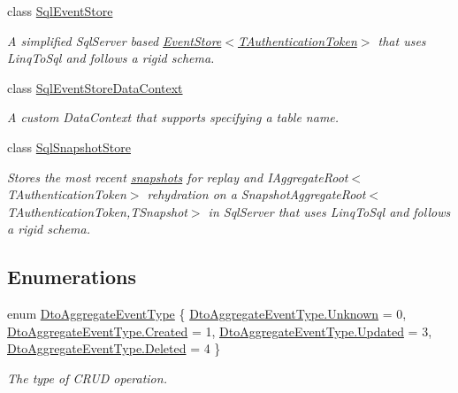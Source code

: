 \begin{DoxyCompactItemize}
class \hyperlink{classCqrs_1_1Events_1_1SqlEventStore}{Sql\+Event\+Store}
\begin{DoxyCompactList}\small\item\em A simplified Sql\+Server based \hyperlink{classCqrs_1_1Events_1_1EventStore_a6346cb2aea4c5b4e740dc6cfb15abab8_a6346cb2aea4c5b4e740dc6cfb15abab8}{Event\+Store$<$\+T\+Authentication\+Token$>$} that uses Linq\+To\+Sql and follows a rigid schema. \end{DoxyCompactList}\item 
class \hyperlink{classCqrs_1_1Events_1_1SqlEventStoreDataContext}{Sql\+Event\+Store\+Data\+Context}
\begin{DoxyCompactList}\small\item\em A custom Data\+Context that supports specifying a table name. \end{DoxyCompactList}\item 
class \hyperlink{classCqrs_1_1Events_1_1SqlSnapshotStore}{Sql\+Snapshot\+Store}
\begin{DoxyCompactList}\small\item\em Stores the most recent \hyperlink{}{snapshots} for replay and I\+Aggregate\+Root$<$\+T\+Authentication\+Token$>$ rehydration on a Snapshot\+Aggregate\+Root$<$\+T\+Authentication\+Token,\+T\+Snapshot$>$ in Sql\+Server that uses Linq\+To\+Sql and follows a rigid schema. \end{DoxyCompactList}\end{DoxyCompactItemize}
\subsection*{Enumerations}
\begin{DoxyCompactItemize}
\item 
enum \hyperlink{namespaceCqrs_1_1Events_a2a32e13adeac92f5a93966cd8ee2d39a_a2a32e13adeac92f5a93966cd8ee2d39a}{Dto\+Aggregate\+Event\+Type} \{ \hyperlink{namespaceCqrs_1_1Events_a2a32e13adeac92f5a93966cd8ee2d39a_a2a32e13adeac92f5a93966cd8ee2d39aa88183b946cc5f0e8c96b2e66e1c74a7e}{Dto\+Aggregate\+Event\+Type.\+Unknown} = 0, 
\hyperlink{namespaceCqrs_1_1Events_a2a32e13adeac92f5a93966cd8ee2d39a_a2a32e13adeac92f5a93966cd8ee2d39aa0eceeb45861f9585dd7a97a3e36f85c6}{Dto\+Aggregate\+Event\+Type.\+Created} = 1, 
\hyperlink{namespaceCqrs_1_1Events_a2a32e13adeac92f5a93966cd8ee2d39a_a2a32e13adeac92f5a93966cd8ee2d39aaff0a3b7f3daef040faf89a88fdac01b7}{Dto\+Aggregate\+Event\+Type.\+Updated} = 3, 
\hyperlink{namespaceCqrs_1_1Events_a2a32e13adeac92f5a93966cd8ee2d39a_a2a32e13adeac92f5a93966cd8ee2d39aa5fe6005bf6e415c950c011fb65f12b8f}{Dto\+Aggregate\+Event\+Type.\+Deleted} = 4
 \}\begin{DoxyCompactList}\small\item\em The type of C\+R\+UD operation. \end{DoxyCompactList}
\end{DoxyCompactItemize}


